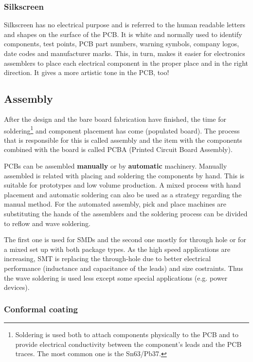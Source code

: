 \documentclass[final]{cubedoc}
\begin{document}
	\subsubsection{Silkscreen}
	
	Silkscreen has no electrical purpose and is referred to the human readable letters and shapes on the surface of the PCB. It is white and normally used to identify components, test points, PCB part numbers, warning symbols, company logos, date codes and manufacturer marks. This, in turn, makes it easier for electronics assemblers to place each electrical component in the proper place and in the right direction. It gives a more artistic tone in the PCB, too!
	
	
	\subsection{Assembly}
	
	After the design and the bare board fabrication have finished, the time for soldering\footnote{Soldering is used both to attach components physically to the PCB and to provide electrical conductivity between the component’s leads and the PCB traces. The most common one is the Sn63/Pb37.} and component placement has come (populated board). The process that is responsible for this is called assembly and the item with the components combined with the board is called PCBA (Printed Circuit Board Assembly).
	
	PCBs can be assembled \textbf{manually} or by \textbf{automatic} machinery. Manually assembled is related with placing and soldering the components by hand. This is suitable for prototypes and low volume production. A mixed process with hand placement and automatic soldering can also be used as a strategy regarding the manual method. For the automated assembly, pick and place machines are substituting the hands of the assemblers and the soldering process can be divided to reflow and wave soldering. 
	
	The first one is used for SMDs and the second one mostly for through hole or for a mixed set up with both package types. 
	As the high speed applications are increasing, SMT is replacing the through-hole due to better electrical performance (inductance and capacitance of the leads) and size costraints. Thus the wave soldering is used less except some special applications (e.g. power devices).
	
	\subsubsection{Conformal coating}
	
\end{document}
